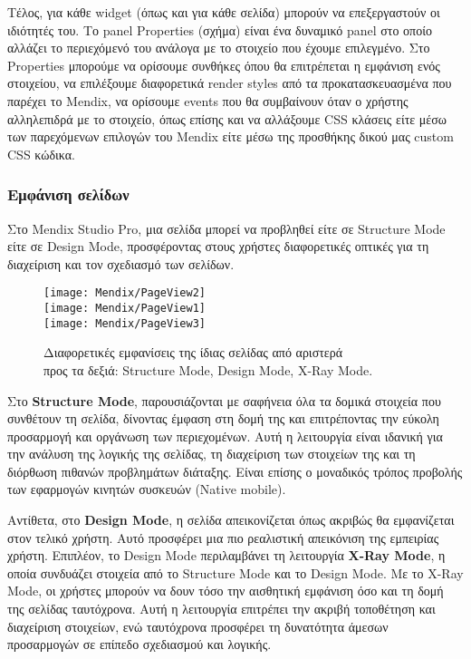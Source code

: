                 Τέλος, για κάθε widget (όπως και για κάθε σελίδα) μπορούν να επεξεργαστούν οι ιδιότητές του. Το panel Properties (σχήμα) είναι ένα δυναμικό panel στο οποίο αλλάζει το περιεχόμενό του ανάλογα με το στοιχείο που έχουμε επιλεγμένο. Στο Properties μπορούμε να ορίσουμε συνθήκες όπου θα επιτρέπεται η εμφάνιση ενός στοιχείου, να επιλέξουμε διαφορετικά render styles από τα προκατασκευασμένα που παρέχει το Mendix, να ορίσουμε events που θα συμβαίνουν όταν ο χρήστης αλληλεπιδρά με το στοιχείο, όπως επίσης και να αλλάξουμε CSS κλάσεις είτε μέσω των παρεχόμενων επιλογών του Mendix είτε μέσω της προσθήκης δικού μας custom CSS κώδικα.

        \subsubsection{Εμφάνιση σελίδων} \label{sec:MendixPageView}
            Στο Mendix Studio Pro, μια σελίδα μπορεί να προβληθεί είτε σε Structure Mode είτε σε Design Mode, προσφέροντας στους χρήστες διαφορετικές οπτικές για τη διαχείριση και τον σχεδιασμό των σελίδων.

            \begin{figure}[h!] \noindent \centering
                    \texttt{[image: Mendix/PageView2]} \\
                    \texttt{[image: Mendix/PageView1]} \\
                    \texttt{[image: Mendix/PageView3]}
                    \caption{\centering Διαφορετικές εμφανίσεις της ίδιας σελίδας από αριστερά \\ προς τα δεξιά: Structure Mode, Design Mode, X-Ray Mode.}
            \end{figure}

            Στο \textbf{Structure Mode}, παρουσιάζονται με σαφήνεια όλα τα δομικά στοιχεία που συνθέτουν τη σελίδα, δίνοντας έμφαση στη δομή της και επιτρέποντας την εύκολη προσαρμογή και οργάνωση των περιεχομένων. Αυτή η λειτουργία είναι ιδανική για την ανάλυση της λογικής της σελίδας, τη διαχείριση των στοιχείων της και τη διόρθωση πιθανών προβλημάτων διάταξης. Είναι επίσης ο μοναδικός τρόπος προβολής των εφαρμογών κινητών συσκευών (Native mobile).

            Αντίθετα, στο \textbf{Design Mode}, η σελίδα απεικονίζεται όπως ακριβώς θα εμφανίζεται στον τελικό χρήστη. Αυτό προσφέρει μια πιο ρεαλιστική απεικόνιση της εμπειρίας χρήστη. Επιπλέον, το Design Mode περιλαμβάνει τη λειτουργία \textbf{X-Ray Mode}, η οποία συνδυάζει στοιχεία από το Structure Mode και το Design Mode. Με το X-Ray Mode, οι χρήστες μπορούν να δουν τόσο την αισθητική εμφάνιση όσο και τη δομή της σελίδας ταυτόχρονα. Αυτή η λειτουργία επιτρέπει την ακριβή τοποθέτηση και διαχείριση στοιχείων, ενώ ταυτόχρονα προσφέρει τη δυνατότητα άμεσων προσαρμογών σε επίπεδο σχεδιασμού και λογικής.

